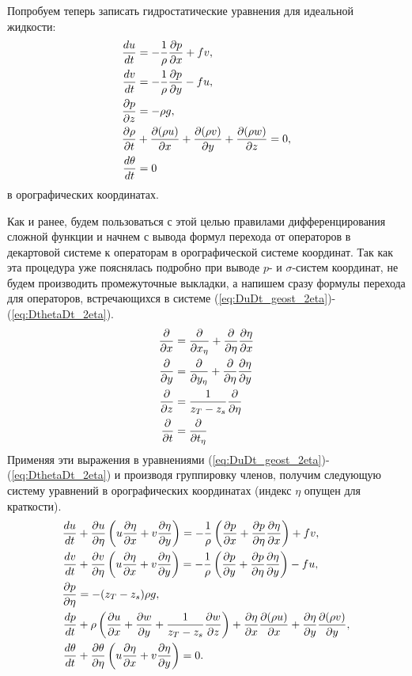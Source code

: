 Попробуем теперь записать гидростатические уравнения для идеальной жидкости:
    \begin{align}
        \td{u}{t} &= -\frac{1}{\rho}\pd{p}{x}+fv, \label{eq:DuDt_geost_2eta} \\
        \td{v}{t} &= -\frac{1}{\rho}\pd{p}{y}-fu,  \label{eq:DvDt_geost_2eta} \\
        \pd{p}{z} &= -\rho g, \label{eq:DpDz_geost_2eta} \\
        \pd{\rho}{t} &+ \pd{(\rho u)}{x} + \pd{(\rho v)}{y} + \pd{(\rho w)}{z} = 0, \label{eq:M_geost_2eta} \\
        \td{\theta}{t} &= 0 \label{eq:DthetaDt_2eta} 
    \end{align} 
в орографических координатах. 

Как и ранее, будем пользоваться с этой целью правилами дифференцирования сложной функции и начнем с вывода формул перехода от операторов в декартовой системе к операторам в орографической системе координат. Так как эта процедура уже пояснялась подробно при выводе $p$- и $\sigma$-систем координат, не будем производить промежуточные выкладки, а напишем сразу формулы перехода для операторов, встречающихся в системе (\ref{eq:DuDt_geost_2eta})-(\ref{eq:DthetaDt_2eta}). 
    \begin{align}
        \pd{}{x}&=\pd{}{x_{\eta}}+\pd{}{\eta}\pd{\eta}{x} \label{eq:eta2fx} \\
        \pd{}{y}&=\pd{}{y_{\eta}}+\pd{}{\eta}\pd{\eta}{y} \label{eq:eta2fy} \\
        \pd{}{z}&= \frac{1}{z_T-z_s}\pd{}{\eta} \label{eq:eta2fz} \\
        \pd{}{t}&=\pd{}{t_{\eta}}
        \end{align}
Применяя эти выражения в уравнениями (\ref{eq:DuDt_geost_2eta})-(\ref{eq:DthetaDt_2eta}) и производя группировку членов, получим следующую систему уравнений в орографических координатах (индекс $\eta$ опущен для краткости).
    \begin{align}
        \td{u}{t} &+ \pd{u}{\eta} \left( u\pd{\eta}{x}+v\pd{\eta}{y} \right) = -\frac{1}{\rho} \left( \pd{p}{x} + \pd{p}{\eta}\pd{\eta}{x} \right) + fv, \label{eq:dudt_eta} \\
        \td{v}{t} &+ \pd{v}{\eta} \left( u\pd{\eta}{x}+v\pd{\eta}{y} \right) = -\frac{1}{\rho} \left( \pd{p}{y} + \pd{p}{\eta}\pd{\eta}{y} \right) - fu, \label{eq:dudt_eta} \\
        \pd{p}{\eta}&=-(z_T-z_s)\rho g, \label{eq:etaz} \\
        \td{p}{t} &+ \rho \left( \pd{u}{x} + \pd{w}{y}+ \frac{1}{z_T-z_s}\pd{w}{z} \right) + \pd{\eta}{x}\pd{(\rho u)}{x} + \pd{\eta}{y}\pd{(\rho v)}{y}, \label{eq:M2fy} \\
        \td{\theta}{t} &+ \pd{\theta}{\eta} \left( u\pd{\eta}{x} + v\pd{\eta}{y} \right) = 0. \label{eq:T2fy} \\
    \end{align}
